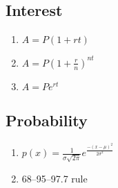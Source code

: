 \documentclass[letterpaper,12pt,fleqn]{article}
\newcommand{\m}{\mu}
\renewcommand{\o}{\sigma}
\begin{document}
\subsection*{Interest}

\begin{enumerate}
\item \(A=P(1+rt)\)
\item \(A=P\left(1+\frac{r}{n}\right)^{nt}\)
\item \(A=Pe^{rt}\)
\end{enumerate}

\subsection*{Probability}

\begin{enumerate}
\item \(\displaystyle p(x)=\frac{1}{\o\sqrt{2\pi}}e^{\frac{-(x-\m)^2}{2\o^2}}\)
\item 68--95--97.7 rule
\end{enumerate}
\end{document}
